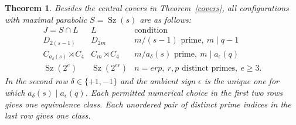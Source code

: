 \documentclass[11pt,a4paper]{article}
\newtheorem{theorem}{Theorem}
\newcommand{\Sz}{\operatorname{Sz}}
\begin{document}
\begin{theorem}\label{list}
Besides the central covers in Theorem~\ref{covers}, all configurations
with maximal parabolic $S=\Sz(s)$ are as follows:
\[
\begin{array}{c|c|c}
 J=S\cap L&L&\text{condition}\\\hline
 D_{2(s-1)}&D_{2m}&m/(s-1)\text{ prime},\ m\mid q-1\\
 C_{a_\delta(s)}\rtimes C_4&C_m\rtimes C_4&
 m/a_\delta(s)\text{ prime},\ m\mid a_\epsilon(q)\\
 \Sz(2^e)&\Sz(2^{er})&
 n=erp,\ r,p\text{ distinct primes},\ e\ge3.
\end{array}                                               \tag{4}
\]
In the second row $\delta\in\{+1,-1\}$ and the ambient sign
$\epsilon$ is the unique one for which
$a_\delta(s)\mid a_\epsilon(q)$. Each permitted numerical choice
in the first two rows gives one equivalence class. Each unordered
pair of distinct prime indices in the last row gives one class.
\end{theorem}
\end{document}

